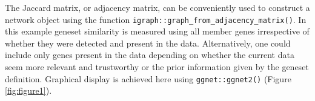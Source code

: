 \documentclass[9pt,a4paper,]{extarticle}
\newenvironment{Shaded}{\begin{snugshade}}{\end{snugshade}}
\newcommand{\KeywordTok}[1]{\textcolor[rgb]{0.13,0.29,0.53}{\textbf{#1}}}
\newcommand{\DecValTok}[1]{\textcolor[rgb]{0.00,0.00,0.81}{#1}}
\newcommand{\StringTok}[1]{\textcolor[rgb]{0.31,0.60,0.02}{#1}}
\newcommand{\CommentTok}[1]{\textcolor[rgb]{0.56,0.35,0.01}{\textit{#1}}}
\newcommand{\ControlFlowTok}[1]{\textcolor[rgb]{0.13,0.29,0.53}{\textbf{#1}}}
\newcommand{\OperatorTok}[1]{\textcolor[rgb]{0.81,0.36,0.00}{\textbf{#1}}}
\newcommand{\NormalTok}[1]{#1}
\begin{document}
\begin{Shaded}
\end{Shaded}

The Jaccard matrix, or adjacency matrix, can be conveniently used to construct a network object using the function \texttt{igraph::graph\_from\_adjacency\_matrix()}. In this example geneset similarity is measured using all member genes irrespective of whether they were detected and present in the data. Alternatively, one could include only genes present in the data depending on whether the current data seem more relevant and trustworthy or the prior information given by the geneset definition. Graphical display is achieved here using \texttt{ggnet::ggnet2()} (Figure \ref{fig:figure1}).
\end{document}
